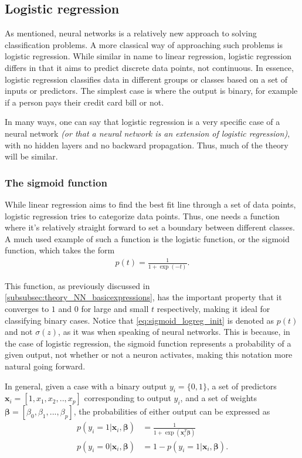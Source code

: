 \documentclass[10pt, twocolumn]{article}
\begin{document}
\subsection{Logistic regression}\label{subsec:theory_logreg}
As mentioned, neural networks is a relatively new approach to solving classification problems. A more classical way of approaching such problems is logistic regression. While similar in name to linear regression, logistic regression differs in that it aims to predict discrete data points, not continuous. In essence, logistic regression classifies data in different groups or classes based on a set of inputs or predictors. The simplest case is where the output is binary, for example if a person pays their credit card bill or not. 

In many ways, one can say that logistic regression is a very specific case of a neural network \textit{(or that a neural network is an extension of logistic regression)}, with no hidden layers and no backward propagation. Thus, much of the theory will be similar. 

\subsubsection{The sigmoid function}
While linear regression aims to find the best fit line through a set of data points, logistic regression tries to categorize data points. Thus, one needs a function where it's relatively straight forward to set a boundary between different classes. A much used example of such a function is the logistic function, or the sigmoid function, which takes the form
\begin{align}\label{eq:sigmoid_logreg_init}
    p(t) = \frac{1}{1+\exp(-t)}.
\end{align}

This function, as previously discussed in \cref{subsubsec:theory_NN_basicexpressions}, has the important property that it converges to $1$ and $0$ for large and small $t$ respectively, making it ideal for classifying binary cases. Notice that \cref{eq:sigmoid_logreg_init} is denoted as $p(t)$ and not $\sigma(z)$, as it was when speaking of neural networks. This is because, in the case of logistic regression, the sigmoid function represents a probability of a given output, not whether or not a neuron activates, making this notation more natural going forward. 

In general, given a case with a binary output $y_i = \{0,1\}$, a set of predictors $\bm{x}_i = [1, x_1, x_2,..,x_p]$ corresponding to output $y_i$, and a set of weights $\bm{\beta} = [\beta_0, \beta_1,...,\beta_p]$, the probabilities of either output can be expressed as 
\begin{align}\label{eq:sigmoid_logreg_prob}
    p(y_i = 1|\bm{x}_i, \bm{\beta}) &= \frac{1}{1+\exp(\bm{x}_i^T\bm{\beta})} \\
    p(y_i = 0|\bm{x}_i, \bm{\beta}) &= 1 - p(y_i = 1|\bm{x}_i, \bm{\beta}).
\end{align}
\end{document}
